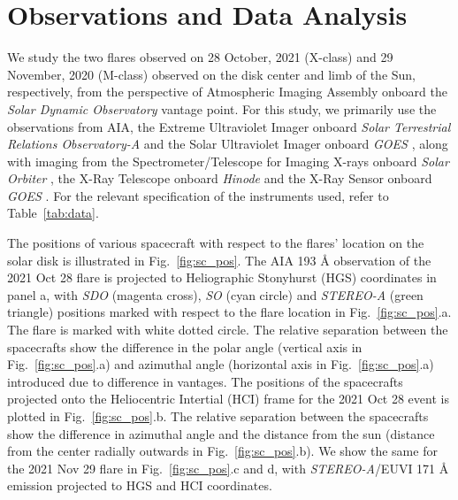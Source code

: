 \section{Observations and Data Analysis}\label{sec:obs}

We study the two flares observed on 28 October, 2021 (X-class) and 29 November, 2020 (M-class) observed on the disk center and limb of the Sun, respectively, from the perspective of Atmospheric Imaging Assembly onboard the {\it Solar Dynamic Observatory} \citep[{\it SDO}/AIA,][]{sdo,aia} vantage point. For this study, we primarily use the observations from AIA, the Extreme Ultraviolet Imager onboard {\it Solar Terrestrial Relations Observatory-A} \citep[{\it STEREO-A}/EUVI,][]{stereo,euvi} and the Solar Ultraviolet Imager onboard {\it GOES} \citep[{\it GOES}/SUVI,][]{suvi}, along with imaging from the Spectrometer/Telescope for Imaging X-rays onboard {\it Solar Orbiter} \citep[{\it SO}/STIX,][]{so,stix,stix1}, the X-Ray Telescope onboard {\it Hinode} \citep[{\it Hinode}/XRT,][]{xrt} and the X-Ray Sensor onboard {\it GOES} \citep[{\it GOES}/XRS,][]{xrs}. For the relevant specification of the instruments used, refer to Table~\ref{tab:data}.

The positions of various spacecraft with respect to the flares' location on the solar disk is illustrated in Fig.~\ref{fig:sc_pos}. The AIA 193 {\AA} observation of the 2021 Oct 28 flare is projected to Heliographic Stonyhurst (HGS) coordinates in panel a, with {\it SDO} (magenta cross), {\it SO} (cyan circle) and {\it STEREO-A} (green triangle) positions marked with respect to the flare location in Fig.~\ref{fig:sc_pos}.a. The flare is marked with white dotted circle. The relative separation between the spacecrafts show the difference in the polar angle (vertical axis in Fig.~\ref{fig:sc_pos}.a) and azimuthal angle (horizontal axis in Fig.~\ref{fig:sc_pos}.a) introduced due to difference in vantages. The positions of the spacecrafts projected onto the Heliocentric Intertial (HCI) frame for the 2021 Oct 28 event is plotted in Fig.~\ref{fig:sc_pos}.b. The relative separation between the spacecrafts show the difference in azimuthal angle and the distance from the sun (distance from the center radially outwards in Fig.~\ref{fig:sc_pos}.b). We show the same for the 2021 Nov 29 flare in Fig.~\ref{fig:sc_pos}.c and d, with {\it STEREO-A}/EUVI 171 {\AA} emission projected to HGS and HCI coordinates.%

